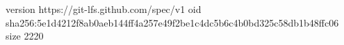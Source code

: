 version https://git-lfs.github.com/spec/v1
oid sha256:5e1d4212f8ab0aeb144ff4a257e49f2be1c4dc5b6c4b0bd325c58db1b48ffc06
size 2220
